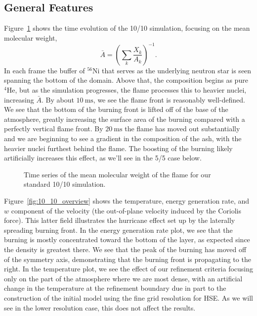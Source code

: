 \documentclass[trackchanges,preprint,times,tighten]{aastex63}
\newcommand{\isot}[2]{$^{#2}\mathrm{#1}$}
\begin{document}
\subsection{General Features}

Figure~\ref{fig:time_series} shows the time evolution of the 10/10
simulation, focusing on the mean molecular weight,
\begin{equation}
\bar{A} = \left ( \sum_k \frac{X_k}{A_k} \right )^{-1}.
\end{equation}
In each frame the buffer of \isot{Ni}{56} that serves as the
underlying neutron star is seen spanning the bottom of the domain.
Above that, the composition begins as pure \isot{He}{4}, but as the
simulation progresses, the flame processes this to heavier nuclei,
increasing $\bar{A}$.  By about $10~\mbox{ms}$, we see the flame front
is reasonably well-defined.  We see that the bottom of the burning
front is lifted off of the base of the atmosphere, greatly increasing
the surface area of the burning compared with a perfectly vertical
flame front.  By $20~\mbox{ms}$ the flame has moved out substantially
and we are beginning to see a gradient in the composition of the ash,
with the heavier nuclei furthest behind the flame.  The boosting of
the burning likely artificially increases this effect, as we'll see in the 5/5 case below.


\begin{figure}[t]
\centering
{}
\caption{\label{fig:time_series} Time series of the mean molecular weight of the 
flame for our standard 10/10 simulation.}
\end{figure}

Figure~\ref{fig:10_10_overview} shows the temperature, energy
generation rate, and $w$ component of the velocity (the out-of-plane
velocity induced by the Coriolis force).  This latter field
illustrates the hurricane effect set up by the laterally spreading
burning front.  In the energy generation rate plot, we see that the
burning is mostly concentrated toward the bottom of the layer, as
expected since the density is greatest there.  We see that the peak of
the burning has moved off of the symmetry axis, demonstrating that the
burning front is propagating to the right.  In the temperature plot,
we see the effect of our refinement criteria focusing only on the part of
the atmosphere where we are most dense, with an artificial change in the
temperature at the refinement boundary due in part to the construction
of the initial model using the fine grid resolution for HSE.  As we will see in the lower resolution case, this does not
affect the results.
\end{document}
